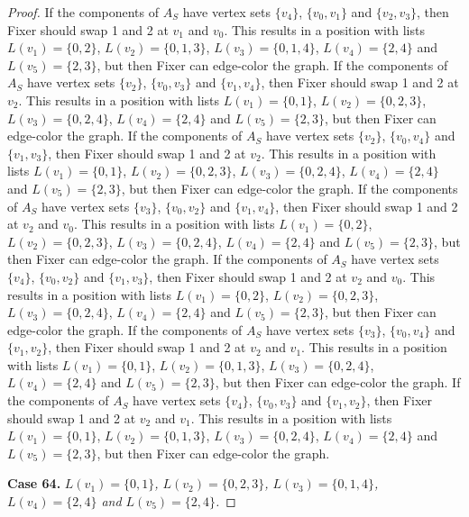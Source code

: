 \documentclass[12pt]{amsart}
\theoremstyle{plain}
\theoremstyle{definition}
\theoremstyle{remark}
\begin{document}
\begin{proof}
If the components of $A_S$ have vertex sets $\{v_4\}$, $\{v_0, v_1\}$ and $\{v_2, v_3\}$, then Fixer should swap 1 and 2 at $v_1$ and $v_0$. This results in a position with lists $L(v_1) = \{0, 2\}$, $L(v_2) = \{0, 1, 3\}$, $L(v_3) = \{0, 1, 4\}$, $L(v_4) = \{2, 4\}$ and $L(v_5) = \{2, 3\}$, but then Fixer can edge-color the graph.
If the components of $A_S$ have vertex sets $\{v_2\}$, $\{v_0, v_3\}$ and $\{v_1, v_4\}$, then Fixer should swap 1 and 2 at $v_2$. This results in a position with lists $L(v_1) = \{0, 1\}$, $L(v_2) = \{0, 2, 3\}$, $L(v_3) = \{0, 2, 4\}$, $L(v_4) = \{2, 4\}$ and $L(v_5) = \{2, 3\}$, but then Fixer can edge-color the graph.
If the components of $A_S$ have vertex sets $\{v_2\}$, $\{v_0, v_4\}$ and $\{v_1, v_3\}$, then Fixer should swap 1 and 2 at $v_2$. This results in a position with lists $L(v_1) = \{0, 1\}$, $L(v_2) = \{0, 2, 3\}$, $L(v_3) = \{0, 2, 4\}$, $L(v_4) = \{2, 4\}$ and $L(v_5) = \{2, 3\}$, but then Fixer can edge-color the graph.
If the components of $A_S$ have vertex sets $\{v_3\}$, $\{v_0, v_2\}$ and $\{v_1, v_4\}$, then Fixer should swap 1 and 2 at $v_2$ and $v_0$. This results in a position with lists $L(v_1) = \{0, 2\}$, $L(v_2) = \{0, 2, 3\}$, $L(v_3) = \{0, 2, 4\}$, $L(v_4) = \{2, 4\}$ and $L(v_5) = \{2, 3\}$, but then Fixer can edge-color the graph.
If the components of $A_S$ have vertex sets $\{v_4\}$, $\{v_0, v_2\}$ and $\{v_1, v_3\}$, then Fixer should swap 1 and 2 at $v_2$ and $v_0$. This results in a position with lists $L(v_1) = \{0, 2\}$, $L(v_2) = \{0, 2, 3\}$, $L(v_3) = \{0, 2, 4\}$, $L(v_4) = \{2, 4\}$ and $L(v_5) = \{2, 3\}$, but then Fixer can edge-color the graph.
If the components of $A_S$ have vertex sets $\{v_3\}$, $\{v_0, v_4\}$ and $\{v_1, v_2\}$, then Fixer should swap 1 and 2 at $v_2$ and $v_1$. This results in a position with lists $L(v_1) = \{0, 1\}$, $L(v_2) = \{0, 1, 3\}$, $L(v_3) = \{0, 2, 4\}$, $L(v_4) = \{2, 4\}$ and $L(v_5) = \{2, 3\}$, but then Fixer can edge-color the graph.
If the components of $A_S$ have vertex sets $\{v_4\}$, $\{v_0, v_3\}$ and $\{v_1, v_2\}$, then Fixer should swap 1 and 2 at $v_2$ and $v_1$. This results in a position with lists $L(v_1) = \{0, 1\}$, $L(v_2) = \{0, 1, 3\}$, $L(v_3) = \{0, 2, 4\}$, $L(v_4) = \{2, 4\}$ and $L(v_5) = \{2, 3\}$, but then Fixer can edge-color the graph.

\noindent\textbf{Case 64.  }\textit{$L(v_1) = \{0, 1\}$, $L(v_2) = \{0, 2, 3\}$, $L(v_3) = \{0, 1, 4\}$, $L(v_4) = \{2, 4\}$ and $L(v_5) = \{2, 4\}$.}


\end{proof}
\end{document}
